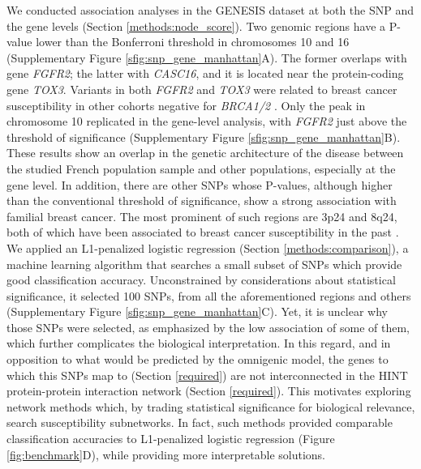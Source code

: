 \documentclass[twocolumn, 10pt]{article}
\begin{document}
We conducted association analyses in the GENESIS dataset at both the SNP and the gene levels (Section \ref{methods:node_score}). Two genomic regions have a P-value lower than the Bonferroni threshold in chromosomes 10 and 16 (Supplementary Figure \ref{sfig:snp_gene_manhattan}A). The former overlaps with gene \emph{FGFR2}; the latter with \emph{CASC16}, and it is located near the protein-coding gene \emph{TOX3}. Variants in both \emph{FGFR2} and \emph{TOX3} were related to breast cancer susceptibility in other cohorts negative for \emph{BRCA1/2} \cite{rinella_genetic_2013}. Only the peak in chromosome 10 replicated in the gene-level analysis, with \emph{FGFR2} just above the threshold of significance (Supplementary Figure \ref{sfig:snp_gene_manhattan}B). These results show an overlap in the genetic architecture of the disease between the studied French population sample and other populations, especially at the gene level. In addition, there are other SNPs whose P-values, although higher than the conventional threshold of significance, show a strong association with familial breast cancer. The most prominent of such regions are 3p24 and 8q24, both of which have been associated to breast cancer susceptibility in the past \cite{brisbin_meta-analysis_2011,search_newly_2009}. We applied an L1-penalized logistic regression (Section \ref{methods:comparison}), a machine learning algorithm that searches a small subset of SNPs which provide good classification accuracy. Unconstrained by considerations about statistical significance, it selected 100 SNPs, from all the aforementioned regions and others (Supplementary Figure \ref{sfig:snp_gene_manhattan}C). Yet, it is unclear why those SNPs were selected, as emphasized by the low association of some of them, which further complicates the biological interpretation. In this regard, and in opposition to what would be predicted by the omnigenic model, the genes to which this SNPs map to (Section \ref{required}) are not interconnected in the HINT protein-protein interaction network (Section \ref{required}). This motivates exploring network methods which, by trading statistical significance for biological relevance, search susceptibility subnetworks. In fact, such methods provided comparable classification accuracies to L1-penalized logistic regression (Figure \ref{fig:benchmark}D), while providing more interpretable solutions. 
\end{document}
